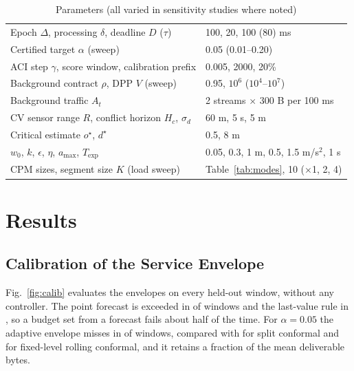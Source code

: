 \documentclass[journal]{IEEEtran}
\theoremstyle{remark}
\begin{document}
\begin{table}[t]
\caption{Parameters (all varied in sensitivity studies where noted)}\label{tab:params}\centering\scriptsize
\begin{tabular}{ll}
\toprule
Epoch $\Delta$, processing $\delta$, deadline $D$ ($\tau$) & 100, 20, 100 (80) ms\\
Certified target $\alpha$ (sweep) & 0.05 (0.01--0.20)\\
ACI step $\gamma$, score window, calibration prefix & 0.005, 2000, 20\%\\
Background contract $\rho$, DPP $V$ (sweep) & 0.95, $10^6$ ($10^4$--$10^7$)\\
Background traffic $A_t$ & 2 streams $\times$ 300 B per 100 ms\\
CV sensor range $R$, conflict horizon $H_c$, $\sigma_d$ & 60 m, 5 s, 5 m\\
Critical estimate $o^\star$, $d^\star$ & 0.5, 8 m\\
$w_0$, $k$, $\epsilon$, $\eta$, $a_{\max}$, $T_{\exp}$ & 0.05, 0.3, 1 m, 0.5, 1.5 m/s$^2$, 1 s\\
CPM sizes, segment size $K$ (load sweep) & Table~\ref{tab:modes}, 10 ($\times$1, 2, 4)\\
\bottomrule
\end{tabular}
\end{table}

\section{Results}\label{sec:results}
\subsection{Calibration of the Service Envelope}
Fig.~\ref{fig:calib} evaluates the envelopes on every held-out window, without any controller. The point forecast is exceeded in \resEnvPointMiss{} of windows and the last-value rule in \resEnvLastMiss{}, so a budget set from a forecast fails about half of the time. For $\alpha=0.05$ the adaptive envelope misses in \resEnvAciAZeroFiveMiss{} of windows, compared with \resEnvSplitAZeroFiveMiss{} for split conformal and \resEnvRollingAZeroFiveMiss{} for fixed-level rolling conformal, and it retains a fraction \resEnvAciAZeroFiveEff{} of the mean deliverable bytes.
\end{document}
